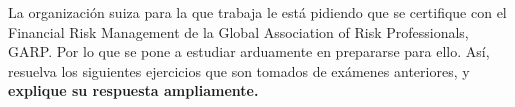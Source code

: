 La organización suiza para la que trabaja le está pidiendo que se
certifique con el Financial Risk Management de la Global Association 
of Risk Professionals, GARP. Por lo que se pone a estudiar
arduamente en prepararse para ello. Así, resuelva los siguientes
ejercicios que son tomados de exámenes anteriores, y \textbf{explique su
respuesta ampliamente.}